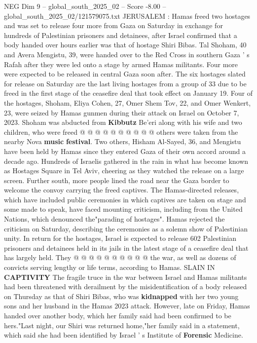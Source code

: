 \begin{textsample}{NEG Dim 9 – global\_south\_2025\_02 – Score -8.00 – global\_south\_2025\_02/121579075.txt}  \label{ex:f9_neg_183}
JERUSALEM : Hamas freed two hostages and was set to release four more from Gaza on Saturday in exchange for hundreds of Palestinian prisoners and detainees, after Israel confirmed that a body handed over hours earlier was that of hostage Shiri Bibas.
Tal Shoham, 40 and Avera Mengistu, 39, were handed over to the Red Cross in southern Gaza ' s Rafah after they were led onto a stage by armed Hamas militants.
Four more were expected to be released in central Gaza soon after.
The six hostages slated for release on Saturday are the last living hostages from a group of 33 due to be freed in the first stage of the ceasefire deal that took effect on January 19.
Four of the hostages, Shoham, Eliya Cohen, 27, Omer Shem Tov, 22, and Omer Wenkert, 23, were seized by Hamas gunmen during their attack on Israel on October 7, 2023.
Shoham was abducted from \textbf{Kibbutz} Be'eri along with his wife and two children, who were freed @ @ @ @ @ @ @ @ @ @ others were taken from the nearby Nova \textbf{music} \textbf{festival}.
Two others, Hisham Al-Sayed, 36, and Mengistu have been held by Hamas since they entered Gaza of their own accord around a decade ago.
Hundreds of Israelis gathered in the rain in what has become known as Hostages Square in Tel Aviv, cheering as they watched the release on a large screen.
Further south, more people lined the road near the Gaza border to welcome the convoy carrying the freed captives.
The Hamas-directed releases, which have included public ceremonies in which captives are taken on stage and some made to speak, have faced mounting criticism, including from the United Nations, which denounced the"parading of hostages".
Hamas rejected the criticism on Saturday, describing the ceremonies as a solemn show of Palestinian unity.
In return for the hostages, Israel is expected to release 602 Palestinian prisoners and detainees held in its jails in the latest stage of a ceasefire deal that has largely held.
They @ @ @ @ @ @ @ @ @ @ the war, as well as dozens of convicts serving lengthy or life terms, according to Hamas.
SLAIN IN \textbf{CAPTIVITY} The fragile truce in the war between Israel and Hamas militants had been threatened with derailment by the misidentification of a body released on Thursday as that of Shiri Bibas, who was \textbf{kidnapped} with her two young sons and her husband in the Hamas 2023 attack.
However, late on Friday, Hamas handed over another body, which her family said had been confirmed to be hers."Last night, our Shiri was returned home,"her family said in a statement, which said she had been identified by Israel ' s Institute of \textbf{Forensic} Medicine.

\end{textsample}
